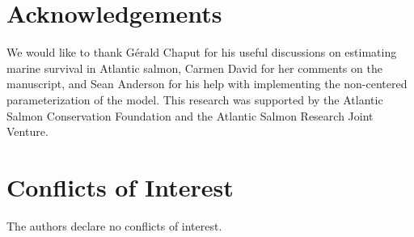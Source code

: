 \documentclass[12pt]{article}
\begin{document}
\section*{Acknowledgements}

We would like to thank G\'{e}rald Chaput for his useful discussions on
estimating marine survival in Atlantic salmon, Carmen David for her comments
on the manuscript, and Sean Anderson for his help with implementing the
non-centered parameterization of the model. This research was supported by the
Atlantic Salmon Conservation Foundation and the Atlantic Salmon Research Joint
Venture.

\section*{Conflicts of Interest}

The authors declare no conflicts of interest.
 


%
\end{document}
